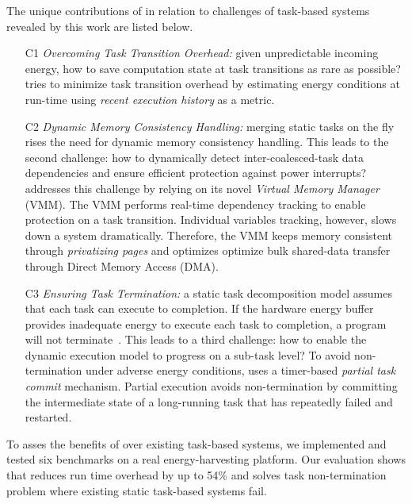 The unique contributions of \sys in relation to challenges of task-based systems revealed by this work are listed below.

\begin{itemize}

\item[C1] \emph{Overcoming Task Transition Overhead:} given unpredictable incoming energy, how to save computation state at task transitions as rare as possible? \sys tries to minimize task transition overhead by estimating energy conditions at run-time using \emph{recent execution history} as a metric.

\item[C2] \emph{Dynamic Memory Consistency Handling:} merging static tasks on the fly rises  the need for dynamic memory consistency handling. This leads to the second challenge: how to dynamically detect inter-coalesced-task data dependencies and ensure efficient protection against power interrupts? \sys addresses this challenge by relying on its novel \emph{Virtual Memory Manager} (VMM). The VMM performs real-time dependency tracking to enable protection on a task transition. Individual variables tracking, however, slows down a system dramatically. Therefore, the VMM keeps memory consistent through \emph{privatizing pages} and optimizes optimize bulk shared-data transfer through Direct Memory Access (DMA).


\item[C3] \emph{Ensuring Task Termination:} a static task decomposition model assumes that each task can execute to completion. If the hardware energy buffer provides inadequate energy to execute each task to completion, a program will not terminate~\cite{cleancut_2018}. This leads to a third challenge: how to enable the dynamic execution model to progress on a sub-task level? To avoid non-termination under adverse energy conditions, \sys uses a timer-based {\em partial task commit} mechanism. Partial execution avoids non-termination by committing the intermediate state of a long-running task that has repeatedly failed and restarted.

\end{itemize}

To asses the benefits of \sys over existing task-based systems, we implemented and tested six benchmarks on a real energy-harvesting platform. Our evaluation shows that \sys reduces run time overhead by up to 54\% and solves task non-termination problem where existing static task-based systems fail.
 
